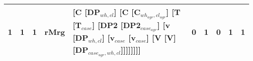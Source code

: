 \begin{tabularx}{\linewidth}{rrrlXrrrrr}
   1 &       1 &   1 & rMrg & [C [DP$_{wh,cl}$] [C [C$_{wh_{agr},cl_{agr}}$] [T [T$_{case}$] [DP2 [DP2$_{case_{agr}}$] [v [DP$_{wh,cl}$] [v$_{case}$ [v$_{case}$] [V [V] [DP$_{case_{agr},wh,cl}$]]]]]]]]                                                                                                     &             0 &             1 &                  0 &        1 &        1 \\
\hline
\end{tabularx}\endgroup\\

